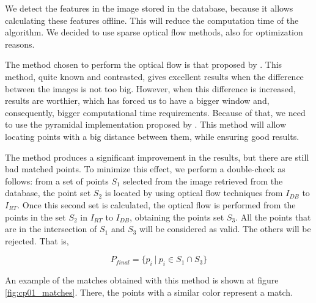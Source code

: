 We detect the features in the image stored in the database, because it allows calculating these features offline. This will reduce the computation time of the algorithm. We decided to use sparse optical flow methods, also for optimization reasons.

The method chosen to perform the optical flow is that proposed by \cite{lucas1981iterative}. This method, quite known and contrasted, gives excellent results when the difference between the images is not too big. However, when this difference is increased, results are worthier, which has forced us to have a bigger window and, consequently, bigger computational time requirements. Because of that, we need to use the pyramidal implementation proposed by \cite{bouguet2001pyramidal}. This method will allow locating points with a big distance between them, while ensuring good results.

The \cite{bouguet2001pyramidal} method produces a significant improvement in the results, but there are still bad matched points. To minimize this effect, we perform a double-check as follows: from a set of points $S_1$ selected from the image retrieved from the database, the point set $S_2$ is located by using optical flow techniques from $I_{DB}$ to $I_{RT}$. Once this second set is calculated, the optical flow is performed from the points in the set $S_2$ in $I_{RT}$ to $I_{DB}$, obtaining the points set $S_3$. All the points that are in the intersection of $S_1$ and $S_3$ will be considered as valid. The others will be rejected. That is,

\begin{equation}\label{eq:cp01_rejected_points}
P_{final} = \{ p_i ~|~ p_i \in S_1 \cap S_3 \}
\end{equation}

An example of the matches obtained with this method is shown at figure \ref{fig:cp01_matches}. There, the points with a similar color represent a match.

